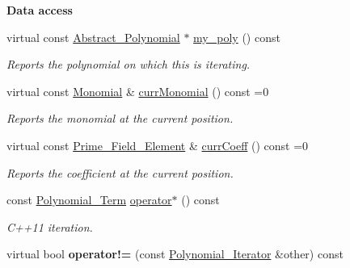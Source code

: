 \begin{Indent}\textbf{ Data access}\par
\begin{DoxyCompactItemize}
\item 
\mbox{\label{class_polynomial___iterator_a7c21bc208d7a71c4a806c4abd1dcf05f}} 
virtual const \hyperlink{class_abstract___polynomial}{Abstract\+\_\+\+Polynomial} $\ast$ \hyperlink{class_polynomial___iterator_a7c21bc208d7a71c4a806c4abd1dcf05f}{my\+\_\+poly} () const
\begin{DoxyCompactList}\small\item\em Reports the polynomial on which {\ttfamily this} is iterating. \end{DoxyCompactList}\item 
\mbox{\label{class_polynomial___iterator_a95408f0c39ca1cec17dd7802337fe028}} 
virtual const \hyperlink{class_monomial}{Monomial} \& \hyperlink{class_polynomial___iterator_a95408f0c39ca1cec17dd7802337fe028}{curr\+Monomial} () const =0
\begin{DoxyCompactList}\small\item\em Reports the monomial at the current position. \end{DoxyCompactList}\item 
\mbox{\label{class_polynomial___iterator_a92a7e8c4e0054153a2554c8009536405}} 
virtual const \hyperlink{class_prime___field___element}{Prime\+\_\+\+Field\+\_\+\+Element} \& \hyperlink{class_polynomial___iterator_a92a7e8c4e0054153a2554c8009536405}{curr\+Coeff} () const =0
\begin{DoxyCompactList}\small\item\em Reports the coefficient at the current position. \end{DoxyCompactList}\item 
\mbox{\label{class_polynomial___iterator_a119cd2937a0cacd43585dee8dc95505f}} 
const \hyperlink{class_polynomial___term}{Polynomial\+\_\+\+Term} \hyperlink{class_polynomial___iterator_a119cd2937a0cacd43585dee8dc95505f}{operator$\ast$} () const
\begin{DoxyCompactList}\small\item\em C++11 iteration. \end{DoxyCompactList}\item 
\mbox{\label{class_polynomial___iterator_a55bdf643502d14fc6d59df65465d21cd}} 
virtual bool {\bfseries operator!=} (const \hyperlink{class_polynomial___iterator}{Polynomial\+\_\+\+Iterator} \&other) const
\end{DoxyCompactItemize}
\end{Indent}
